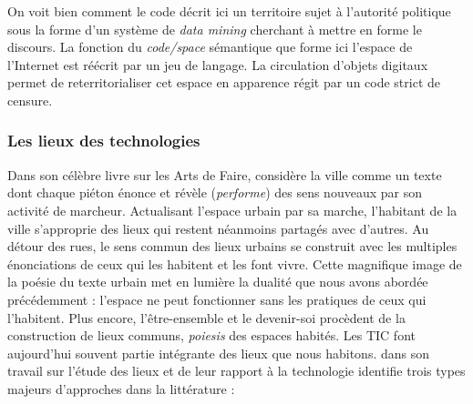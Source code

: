 On voit bien comment le code décrit ici un territoire sujet à l’autorité politique sous la forme d’un système de \textit{data mining} cherchant à mettre en forme le discours. La fonction du \textit{code/space} sémantique que forme ici l’espace de l’Internet est réécrit par un jeu de langage. La circulation d’objets digitaux permet de reterritorialiser cet espace en apparence régit par un code strict de censure. 

\subsubsection{Les lieux des technologies}
Dans son célèbre livre sur les Arts de Faire, \cite{Certeau1980} considère la ville comme un texte dont chaque piéton énonce et révèle (\textit{performe}) des sens nouveaux par son activité de marcheur. Actualisant l’espace urbain par sa marche, l’habitant de la ville s’approprie des lieux qui restent néanmoins partagés avec d’autres. Au détour des rues, le sens commun des lieux urbains se construit avec les multiples énonciations de ceux qui les habitent et les font vivre. Cette magnifique image de la poésie du texte urbain met en lumière la dualité que nous avons abordée précédemment : l’espace ne peut fonctionner sans les pratiques de ceux qui l’habitent. Plus encore, l’être-ensemble et le devenir-soi procèdent de la construction de lieux communs, \textit{poiesis} des espaces habités. Les TIC font aujourd’hui souvent partie intégrante des lieux que nous habitons. \cite{Graham1998} dans son travail sur l’étude des lieux et de leur rapport à la technologie identifie trois types majeurs d’approches dans la littérature :


